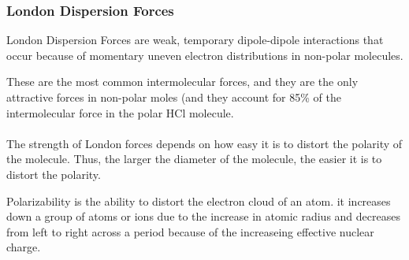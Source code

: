 \subsubsection{London Dispersion Forces}

\begin{defn}
London Dispersion Forces are weak, temporary dipole-dipole interactions that occur because of momentary uneven electron distributions in non-polar molecules.
\end{defn}

\noindent
These are the most common intermolecular forces, and they are the only attractive forces in non-polar moles (and they account for 85\% of the intermolecular force in the polar HCl molecule. \\

\noindent
{} \\

\noindent
The strength of London forces depends on how easy it is to distort the polarity of the molecule. Thus, the larger the diameter of the molecule, the easier it is to distort the polarity.

\begin{defn}
Polarizability is the ability to distort the electron cloud of an atom. it increases down a group of atoms or ions due to the increase in atomic radius and decreases from left to right across a period because of the increaseing effective nuclear charge.
\end{defn}

\noindent
{}
